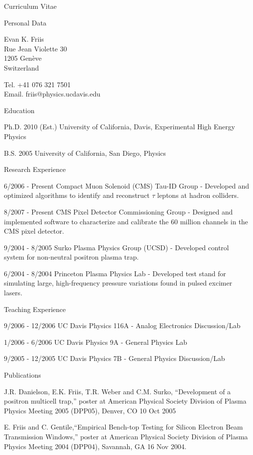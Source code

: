 \documentclass[12pt]{amsart}
\title{}
\author{}
\date{} %
\begin{document}
\begin{cv}{Curriculum Vitae}

\begin{cvlist}{Personal Data}
\item Evan K. Friis\\
Rue Jean Violette 30\\
1205 Gen\`{e}ve\\
Switzerland

\item Tel. +41 076 321 7501\\
Email. friis@physics.ucdavis.edu
\end{cvlist}

\begin{cvlist}{Education}
\item[Ph.D. 2010 (Est.)] University of California, Davis, Experimental High Energy Physics
\item[B.S. 2005] University of California, San Diego, Physics
\end{cvlist}

\begin{cvlist}{Research Experience}
\item[6/2006 - Present] Compact Muon Solenoid (CMS) Tau-ID Group - Developed and optimized algorithms to identify and reconstruct $\tau$ leptons at hadron colliders.
\item[8/2007 - Present] CMS Pixel Detector Commissioning Group - Designed and implemented software to characterize and calibrate the 60 million channels in the CMS pixel detector.
\item[9/2004 - 8/2005] Surko Plasma Physics Group (UCSD) - Developed control system for non-neutral positron plasma trap.
\item[6/2004 - 8/2004] Princeton Plasma Physics Lab - Developed test stand for simulating large, high-frequency pressure variations found in pulsed excimer lasers.
\end{cvlist}

\begin{cvlist}{Teaching Experience}
\item[9/2006 - 12/2006] UC Davis Physics 116A - Analog Electronics Discussion/Lab
\item[1/2006 - 6/2006] UC Davis Physics 9A - General Physics Lab
\item[9/2005 - 12/2005] UC Davis Physics 7B - General Physics Discussion/Lab
\end{cvlist}

\begin{cvlist}{Publications}
\item
 J.R. Danielson, E.K. Friis, T.R. Weber and C.M. Surko, ``Development of a positron multicell trap,'' poster at American Physical Society Division of Plasma Physics Meeting 2005 (DPP05), Denver, CO 10 Oct 2005
\item
E. Friis and C. Gentile,``Empirical Bench-top Testing for Silicon Electron Beam Transmission Windows,'' poster at American Physical Society Division of Plasma Physics Meeting 2004 
(DPP04), Savannah, GA 16 Nov 2004. 
\end{cvlist}


\end{cv}
\end{document}
